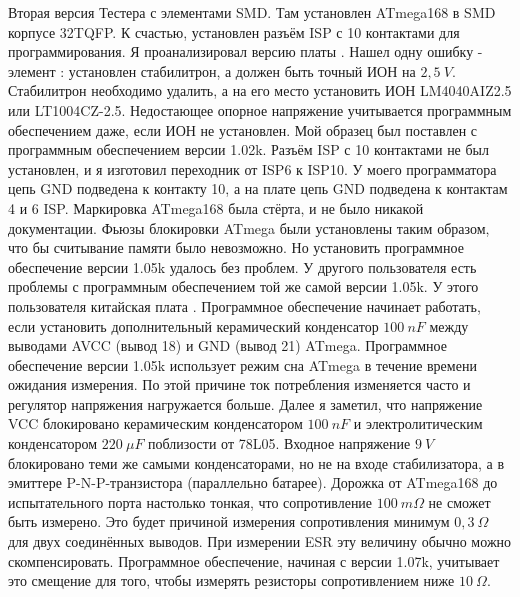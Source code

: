 Вторая версия Тестера с элементами SMD. Там установлен ATmega168 в SMD корпусе 32TQFP. К счастью, установлен разъём ISP 
с 10 контактами для программирования. Я проанализировал версию платы . Нашел одну ошибку - элемент : 
установлен стабилитрон, а должен быть точный ИОН на \(2,5~V\). Стабилитрон необходимо удалить, а на его место установить 
ИОН LM4040AIZ2.5 или LT1004CZ-2.5. Недостающее опорное напряжение учитывается программным обеспечением даже, если ИОН 
не установлен. Мой образец был поставлен с программным обеспечением версии 1.02k. Разъём ISP с 10 контактами не был 
установлен, и я изготовил переходник от ISP6 к ISP10. У моего программатора цепь GND подведена к контакту 10, а на 
плате цепь GND подведена к контактам 4 и 6 ISP. Маркировка ATmega168 была стёрта, и не было никакой документации. 
Фьюзы блокировки ATmega были установлены таким образом, что бы считывание памяти было невозможно. Но установить 
программное обеспечение версии 1.05k удалось без проблем. У другого пользователя есть проблемы с программным 
обеспечением той же самой версии 1.05k. У этого пользователя китайская плата . Программное обеспечение 
начинает работать, если установить дополнительный керамический конденсатор  \(100~nF\) между выводами AVCC (вывод 18) и 
GND (вывод 21) ATmega. Программное обеспечение версии 1.05k использует режим сна ATmega в течение времени ожидания 
измерения. По этой причине ток потребления изменяется часто и регулятор напряжения нагружается больше. Далее я заметил, 
что напряжение VCC блокировано керамическим конденсатором \(100~nF\) и электролитическим конденсатором
\(220~\mu F\) поблизости от 78L05. Входное напряжение \(9~V\) блокировано теми же самыми конденсаторами, но не на входе 
стабилизатора, а в эмиттере P-N-P-транзистора (параллельно батарее). Дорожка от ATmega168 до испытательного порта 
настолько тонкая, что сопротивление \(100~m\Omega\) не сможет быть измерено. Это будет причиной измерения сопротивления 
минимум \(0,3~\Omega\) для двух соединённых выводов. При измерении ESR эту величину обычно можно скомпенсировать. 
Программное обеспечение, начиная с версии 1.07k, учитывает это смещение для того, чтобы измерять резисторы 
сопротивлением ниже \(10~\Omega\).
